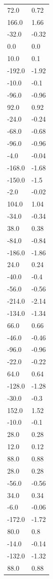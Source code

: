 \begin{longtable}{ll}
72.0 & 0.72 \\
166.0 & 1.66 \\
-32.0 & -0.32 \\
0.0 & 0.0 \\
10.0 & 0.1 \\
-192.0 & -1.92 \\
-10.0 & -0.1 \\
-96.0 & -0.96 \\
92.0 & 0.92 \\
-24.0 & -0.24 \\
-68.0 & -0.68 \\
-96.0 & -0.96 \\
-4.0 & -0.04 \\
-168.0 & -1.68 \\
-150.0 & -1.5 \\
-2.0 & -0.02 \\
104.0 & 1.04 \\
-34.0 & -0.34 \\
38.0 & 0.38 \\
-84.0 & -0.84 \\
-186.0 & -1.86 \\
24.0 & 0.24 \\
-40.0 & -0.4 \\
-56.0 & -0.56 \\
-214.0 & -2.14 \\
-134.0 & -1.34 \\
66.0 & 0.66 \\
-46.0 & -0.46 \\
-96.0 & -0.96 \\
-22.0 & -0.22 \\
64.0 & 0.64 \\
-128.0 & -1.28 \\
-30.0 & -0.3 \\
152.0 & 1.52 \\
-10.0 & -0.1 \\
28.0 & 0.28 \\
12.0 & 0.12 \\
88.0 & 0.88 \\
28.0 & 0.28 \\
-56.0 & -0.56 \\
34.0 & 0.34 \\
-6.0 & -0.06 \\
-172.0 & -1.72 \\
80.0 & 0.8 \\
-14.0 & -0.14 \\
-132.0 & -1.32 \\
88.0 & 0.88 \\

\end{longtable}
